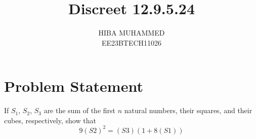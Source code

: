 \documentclass[journal,12pt,onecolumn]{IEEEtran}
\theoremstyle{remark}
\begin{document}
\let\vec\mathbf



\title{Discreet 12.9.5.24}
\author{HIBA MUHAMMED\\
        EE23BTECH11026}
\maketitle

\section*{Problem Statement}
If \(S_1\), \(S_2\), \(S_3\) are the sum of the first \(n\) natural numbers, their squares, and their cubes, respectively, show that 
\[ 9(S\scriptstyle 2)^2 = (S\scriptstyle 3)(1 + 8(S\scriptstyle 1)) \]
\end{document}
